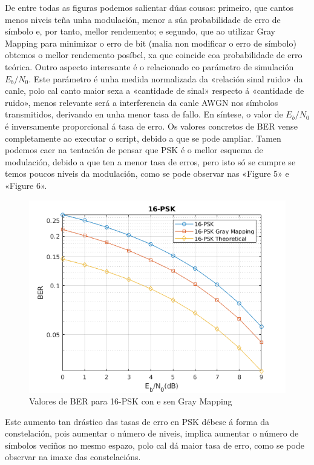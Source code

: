 \documentclass[
	10pt, %
	spanish, %
]{fphw}
\begin{document}
De entre todas as figuras podemos salientar dúas cousas: primeiro, que cantos menos niveis teña unha modulación, menor a súa probabilidade de erro de símbolo e, por tanto, mellor rendemento; e segundo, que ao utilizar Gray Mapping para minimizar o erro de bit (malia non modificar o erro de símbolo) obtemos o mellor rendemento posíbel, xa que coincide coa probabilidade de erro teórica. Outro aspecto interesante é o relacionado co parámetro de simulación $E_b/N_0$. Este parámetro é unha medida normalizada da «relación sinal ruido» da canle, polo cal canto maior sexa a «cantidade de sinal» respecto á «cantidade de ruido», menos relevante será a interferencia da canle AWGN nos símbolos transmitidos, derivando en unha menor tasa de fallo. En síntese, o valor de $E_b/N_0$ é inversamente proporcional á tasa de erro.
Os valores concretos de BER vense completamente ao executar o script, debido a que se pode ampliar.
Tamen podemos caer na tentación de pensar que PSK é o mellor esquema de modulación, debido a que ten a menor tasa de erros, pero isto só se cumpre se temos poucos niveis da modulación, como se pode observar nas «Figure 5» e «Figure 6».
\begin{figure}[htb]
\centering
\includegraphics{16_psk.png}
\caption{Valores de BER para 16-PSK con e sen Gray Mapping}
\end{figure}
Este aumento tan drástico das tasas de erro en PSK débese á forma da constelación, pois aumentar o número de niveis, implica aumentar o número de símbolos veciños no mesmo espazo, polo cal dá maior tasa de erro, como se pode observar na imaxe das constelacións.
\end{document}
